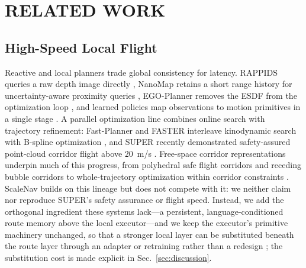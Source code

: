\documentclass[letterpaper,10pt,conference]{ieeeconf}
\begin{document}
\section{RELATED WORK}
\subsection{High-Speed Local Flight}
Reactive and local planners trade global consistency for latency.  RAPPIDS
queries a raw depth image directly \cite{rappids}, NanoMap retains a short
range history for uncertainty-aware proximity queries \cite{nanomap},
EGO-Planner removes the ESDF from the optimization loop \cite{egoplanner},
and learned policies map observations to motion primitives in a single stage
\cite{yopo,loquercio,kaufmann2023}.  A parallel optimization line combines
online search with trajectory refinement: Fast-Planner and FASTER interleave
kinodynamic search with B-spline optimization \cite{fastplanner,faster}, and
SUPER recently demonstrated safety-assured point-cloud corridor flight above
$20$~m/s \cite{super}.  Free-space corridor representations underpin much of
this progress, from polyhedral safe flight corridors \cite{sfc} and receding
bubble corridors \cite{bubble} to whole-trajectory optimization within
corridor constraints \cite{gcopter}.  ScaleNav builds on this lineage but does
not compete with it: we neither claim nor reproduce SUPER's safety assurance
or flight speed.  Instead, we add the orthogonal ingredient these systems
lack---a persistent, language-conditioned route memory above the local
executor---and we keep the executor's primitive machinery unchanged, so that
a stronger local layer can be substituted beneath the route layer through an
adapter or retraining rather than a redesign
\cite{super,egoplanner,gcopter}; the substitution cost is made explicit in
Sec.~\ref{sec:discussion}.
\end{document}
